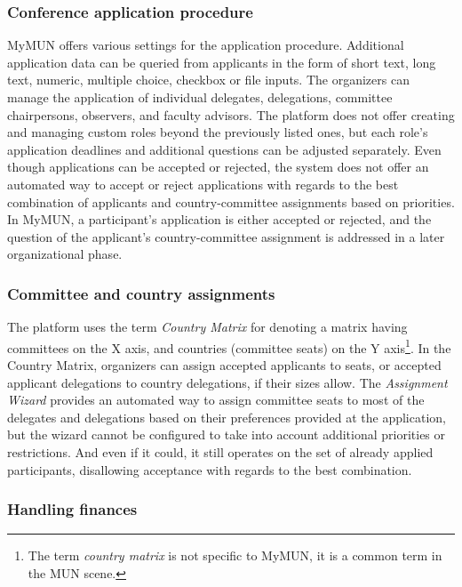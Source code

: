 \subsubsection{Conference application procedure}

MyMUN offers various settings for the application procedure. Additional application data can be queried from applicants in the form of short text, long text, numeric, multiple choice, checkbox or file inputs. The organizers can manage the application of individual delegates, delegations, committee chairpersons, observers, and faculty advisors. The platform does not offer creating and managing custom roles beyond the previously listed ones, but each role's application deadlines and additional questions can be adjusted separately. Even though applications can be accepted or rejected, the system does not offer an automated way to accept or reject applications with regards to the best combination of applicants and country-committee assignments based on priorities. In MyMUN, a participant's application is either accepted or rejected, and the question of the applicant's country-committee assignment is addressed in a later organizational phase.

\subsubsection{Committee and country assignments}

The platform uses the term \emph{Country Matrix} for denoting a matrix having committees on the X axis, and countries (committee seats) on the Y axis\footnote{The term \emph{country matrix} is not specific to MyMUN, it is a common term in the MUN scene.}. In the Country Matrix, organizers can assign accepted applicants to seats, or accepted applicant delegations to country delegations, if their sizes allow. The \emph{Assignment Wizard} provides an automated way to assign committee seats to most of the delegates and delegations based on their preferences provided at the application, but the wizard cannot be configured to take into account additional priorities or restrictions. And even if it could, it still operates on the set of already applied participants, disallowing acceptance with regards to the best combination.

\subsubsection{Handling finances}

